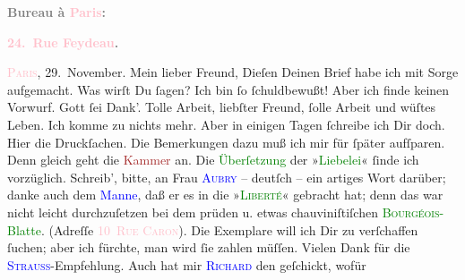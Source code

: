            \pstart
           \begin{otherlanguage}{french}\textcolor{gray}{\textbf{\textbf{Bureau à \textcolor{pink}{Paris}{}\ledrightnote{\textcolor{pink}{Paris}}:}}}\end{otherlanguage}\pend
           \pstart
           \begin{otherlanguage}{french}\textcolor{gray}{\textbf{\textbf{\textcolor{pink}{24. Rue Feydeau}{}\ledrightnote{\textcolor{pink}{rue Feydeau}}.}}}\end{otherlanguage}\hfill \textsc{\textcolor{pink}{Paris}{}\ledrightnote{\textcolor{pink}{Paris}}}, 29. November.\pend
           \pstart\center{}Mein lieber Freund,\pend\pstart
           Dieſen Deinen Brief habe ich mit Sorge aufgemacht. Was wirſt Du ſagen? Ich bin ſo
               ſchuldbewußt! Aber ich finde keinen Vorwurf. Gott ſei Dank’.\pend
           \pstart
           Tolle Arbeit, liebſter Freund, ſolle Arbeit und wüſtes Leben. Ich komme zu nichts
               mehr. Aber in einigen Tagen ſchreibe ich Dir doch.\pend
           \pstart
           Hier die Druckſachen. Die Bemerkungen dazu muß ich mir für ſpäter aufſparen. Denn
               gleich geht die \textcolor{brown}{Kammer}{}\ledrightnote{\textcolor{brown}{Französische Abgeordnetenkammer}} an. {\pb}Die \textcolor{green}{Überſetzung}{} der »\textcolor{green}{Liebelei}{}\ledrightnote{\textcolor{green}{Liebelei. Schauspiel in drei Akten}}« ſinde ich vorzüglich. Schreib’, bitte, an Frau \textsc{\textcolor{blue}{Aubry}{}\ledrightnote{\textcolor{blue}{[MMe. Georges] Aubry}}} – deutſch – ein artiges Wort darüber; danke auch dem \textcolor{blue}{Manne}{}, daß er es in die »\textsc{\textcolor{green}{Liberté}{}\ledrightnote{\textcolor{green}{La Liberté}}}« gebracht hat; denn das war nicht leicht 
               durchzuſetzen bei dem prüden u. etwas chauviniſtiſchen \textcolor{green}{\textsc{Bourgéois}-Blatte}{}. \introOben{}(Adreſſe \textsc{\textcolor{pink}{10 Rue Caron}{}\ledrightnote{\textcolor{pink}{rue Caron}}}).\introOben{} Die Exemplare will ich Dir zu verſchaffen ſuchen; aber ich fürchte,
               man wird ſie zahlen müſſen.\pend
           \pstart
           {\pb}Vielen Dank für die \textsc{\textcolor{blue}{Strauss}{}\ledrightnote{\textcolor{blue}{Johann Strauss}}}-Empfehlung. Auch hat mir \textsc{\textcolor{blue}{Richard}{}\ledrightnote{\textcolor{blue}{Richard Beer-Hofmann}}} den \label{K_L02757-1v}\label{K_L02757-1h} geſchickt, wofür
